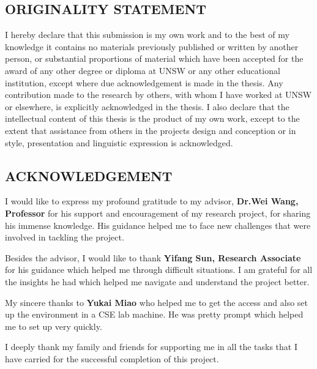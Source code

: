 \documentclass[12pt, a4paper]{report}
\theoremstyle{definition}
\numberwithin{equation}{chapter}
\numberwithin{figure}{chapter}
\numberwithin{table}{chapter}
\begin{document}
\begin{spacing}{1.5}
\chapter*{ORIGINALITY STATEMENT}
\setlength{\parskip}{2.2em}
\setlength{\parindent}{0em}
I hereby declare that this submission is my own work and to the best of my knowledge
it contains no materials previously published or written by another person,
or substantial proportions of material which have been accepted for the award of
any other degree or diploma at UNSW or any other educational institution, except
where due acknowledgement is made in the thesis. Any contribution made to the
research by others, with whom I have worked at UNSW or elsewhere, is explicitly
acknowledged in the thesis. I also declare that the intellectual content of this thesis
is the product of my own work, except to the extent that assistance from others in
the projects design and conception or in style, presentation and linguistic expression
is acknowledged.

\end{spacing}

\begin{spacing}{1.5}
\chapter*{ACKNOWLEDGEMENT}
\setlength{\parskip}{2.2em}
\setlength{\parindent}{0em}
I would like to express my profound gratitude to my advisor, \textbf{Dr.Wei Wang, Professor} for his support and encouragement of my research project, for sharing his immense knowledge. His guidance helped me to face new challenges that were involved in tackling the project.
\par 
\setlength{\parskip}{2.2em}
\setlength{\parindent}{0em}
Besides the advisor, I would like to thank  \textbf{Yifang Sun, Research Associate} for his guidance which helped me through difficult situations. I am grateful for all the insights he had which helped me navigate and understand the project better. 
\par 
\setlength{\parskip}{2.2em}
\setlength{\parindent}{0em}
My sincere thanks to \textbf{Yukai Miao} who helped me to get the access and also set up the environment in a CSE lab machine. He was pretty prompt which helped me to set up very quickly.
\par 
\setlength{\parskip}{2.2em}
\setlength{\parindent}{0em}
I deeply thank my family and friends for supporting me in all the tasks that I have carried for the successful completion of this project.
\end{spacing}
\end{document}
